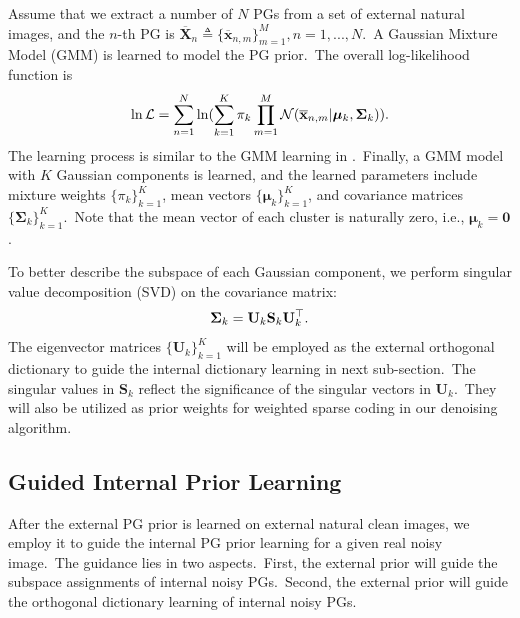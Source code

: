 \documentclass[10pt,twocolumn,letterpaper]{article}
\begin{document}
Assume that we extract a number of $N$ PGs from a set of external natural images, and the $n$-th PG is $\mathbf{\overline{X}}_{n}\triangleq \{\mathbf{\overline{x}}_{n,m}\}_{m=1}^{M}, n=1,...,N$.\ A Gaussian Mixture Model (GMM) is learned to model the PG prior.\ The overall log-likelihood function is
\vspace{-2mm}
\begin{equation}\label{equ1}\vspace{-2mm}
\begin{split}
\ln\mathcal{L}=\sum_{n=1}^{N} \ln(\sum_{k=1}^{K}\pi_{k}\prod_{m=1}^{M}\mathcal{N}(\mathbf{\overline{x}}_{n,m}|\bm{\mu}_{k},\mathbf{\Sigma}_{k})).
\end{split}
\end{equation}
The learning process is similar to the GMM learning in \cite{pgpd,epll}.\ Finally, a GMM model with $K$ Gaussian components is learned, and the learned parameters include mixture weights $\{\pi_{k}\}_{k=1}^{K}$, mean vectors $\{\bm{\mu}_{k}\}_{k=1}^{K}$, and covariance matrices $\{\mathbf{\Sigma}_{k}\}_{k=1}^{K}$.\ Note that the mean vector of each cluster is naturally zero, i.e., $\bm{\mu}_{k}=\mathbf{0}$.  

To better describe the subspace of each Gaussian component, we perform singular value decomposition (SVD) on the covariance matrix:
\vspace{-2mm}
\begin{equation}\label{equ2}\vspace{-2mm}
\mathbf{\Sigma}_{k}=\mathbf{U}_{k}\mathbf{S}_{k}\mathbf{U}_{k}^{\top}.
\end{equation}
The eigenvector matrices $\{\mathbf{U}_{k}\}_{k=1}^{K}$ will be employed as the external orthogonal dictionary to guide the internal dictionary learning in next sub-section.\ The singular values in $\mathbf{S}_{k}$ reflect the significance of the singular vectors in $\mathbf{U}_{k}$.\ They  will also be utilized as prior weights for weighted sparse coding in our denoising algorithm.


\subsection{Guided Internal Prior Learning}

After the external PG prior is learned on external natural clean images, we employ it to guide the internal PG prior learning for a given real noisy image.\ The guidance lies in two aspects.\ First, the external prior will guide the subspace assignments of internal noisy PGs.\ Second, the external prior will guide the orthogonal dictionary learning of internal noisy PGs.
\end{document}
